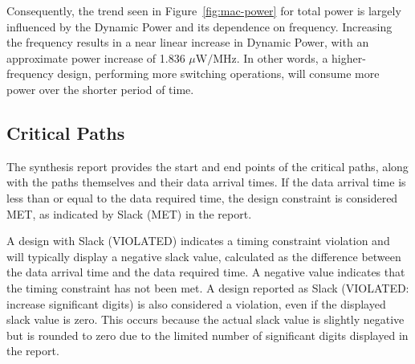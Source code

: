 \documentclass[a4paper,11pt]{article}
\begin{document}
Consequently, the trend seen in Figure~\ref{fig:mac-power} for total power is largely influenced by the Dynamic Power and its dependence on frequency. Increasing the frequency results in a near linear increase in Dynamic Power, with an approximate power increase of 1.836 $\mu\text{W}/\text{MHz}$. In other words, a higher-frequency design, performing more switching operations, will consume more power over the shorter period of time. 

\subsection{Critical Paths}

The synthesis report provides the start and end points of the critical paths, along with the paths themselves and their data arrival times. If the data arrival time is less than or equal to the data required time, the design constraint is considered MET, as indicated by Slack (MET) in the report.

A design with Slack (VIOLATED) indicates a timing constraint violation and will typically display a negative slack value, calculated as the difference between the data arrival time and the data required time. A negative value indicates that the timing constraint has not been met. A design reported as Slack (VIOLATED: increase significant digits) is also considered a violation, even if the displayed slack value is zero. This occurs because the actual slack value is slightly negative but is rounded to zero due to the limited number of significant digits displayed in the report.
\end{document}
